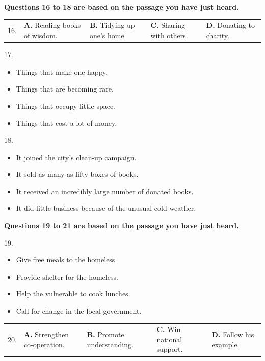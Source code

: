 \documentclass[UTF8,11pt]{ctexart}
\begin{document}
\textbf{Questions 16 to 18 are based on the passage you have just heard.}


\noindent\begin{tabularx}{\linewidth}{@{}lXXXX@{}}16. & \textbf{A.} Reading books of wisdom. & \textbf{B.} Tidying up one's home. & \textbf{C.} Sharing with others. & \textbf{D.} Donating to charity.\\\end{tabularx}\par

17.


\begin{itemize}[leftmargin=2em,itemsep=.2em,topsep=.4em]\item[A.] Things that make one happy.
\item[B.] Things that are becoming rare.
\item[C.] Things that occupy little space.
\item[D.] Things that cost a lot of money.
\end{itemize}

18.


\begin{itemize}[leftmargin=2em,itemsep=.2em,topsep=.4em]\item[A.] It joined the city's clean-up campaign.
\item[B.] It sold as many as fifty boxes of books.
\item[C.] It received an incredibly large number of donated books.
\item[D.] It did little business because of the unusual cold weather.
\end{itemize}

\textbf{Questions 19 to 21 are based on the passage you have just heard.}


19.


\begin{itemize}[leftmargin=2em,itemsep=.2em,topsep=.4em]\item[A.] Give free meals to the homeless.
\item[B.] Provide shelter for the homeless.
\item[C.] Help the vulnerable to cook lunches.
\item[D.] Call for change in the local government.
\end{itemize}

\noindent\begin{tabularx}{\linewidth}{@{}lXXXX@{}}20. & \textbf{A.} Strengthen co-operation. & \textbf{B.} Promote understanding. & \textbf{C.} Win national support. & \textbf{D.} Follow his example.\\\end{tabularx}\par
\end{document}

